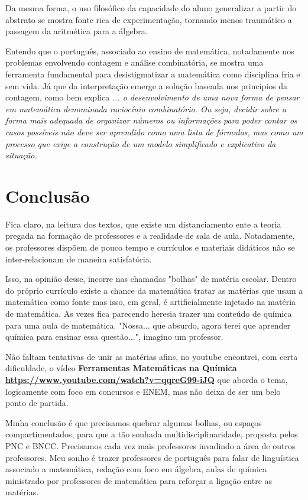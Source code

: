 \documentclass[
	12pt,				%
	openright,			%
	oneside,
	a4paper,			%
	chapter=TITLE,		%
	section=TITLE,		%
	sumario=abnt-6027-2012,
	english,			%
	brazil				%
]{abntex2}
\begin{document}
	Da mesma forma, o uso filosófico da capacidade do aluno generalizar a partir do abstrato se mostra fonte rica de experimentação, tornando menos traumático a passagem da aritmética para a álgebra.
	
	Entendo que o português, associado ao ensino de matemática, notadamente nos problemas envolvendo contagem e análise combinatória, se mostra uma ferramenta fundamental para desistigmatizar a matemática como disciplina fria e sem vida. Já que da interpretação emerge a solução baseada nos princípios da contagem, como bem explica  \textit{... o desenvolvimento de uma nova forma de pensar em matemática denominada raciocínio combinatório. Ou seja, decidir sobre a forma mais adequada de organizar números ou informações para poder contar os casos possíveis não deve ser aprendido como uma lista de fórmulas, mas como um processo que exige a construção de um modelo simplificado e explicativo da situação.}
	
	
	
		

\chapter{Conclusão}

	Fica claro, na leitura dos textos, que existe um distanciamento ente a teoria pregada na formação de professores e a realidade de sala de aula. Notadamente, os professores dispõem de pouco tempo e currículos e materiais didáticos não se inter-relacionam de maneira satisfatória.
	
	Isso, na opinião desse, incorre nas chamadas "bolhas" de matéria escolar. Dentro do próprio currículo existe a chance da matemática tratar as matérias que usam a matemática como fonte mas isso, em geral, é artificialmente injetado na matéria de matemática. As vezes fica parecendo heresia trazer um conteúdo de química para uma aula de matemática. "Nossa... que absurdo, agora terei que aprender química para ensinar essa questão...", imagino um professor.
	
	Não faltam tentativas de unir as matérias afins, no youtube encontrei, com certa dificuldade, o vídeo \textbf{Ferramentas Matemáticas na Química \url{https://www.youtube.com/watch?v=qqreG99-iJQ} } que aborda o tema, logicamente com foco em concursos e ENEM, mas não deixa de ser um belo ponto de partida.

	Minha conclusão é que precisamos quebrar algumas bolhas, ou espaços compartimentados, para que a tão sonhada multidisciplinaridade, proposta pelos PNC e BNCC. Precisamos cada vez mais professores invadindo a área de outros professores. Meu sonho é trazer professores de português para falar de linguística associado a matemática, redação com foco em álgebra, aulas de química ministrado por professores de matemática para reforçar a ligação entre as matérias.
	
\end{document}
